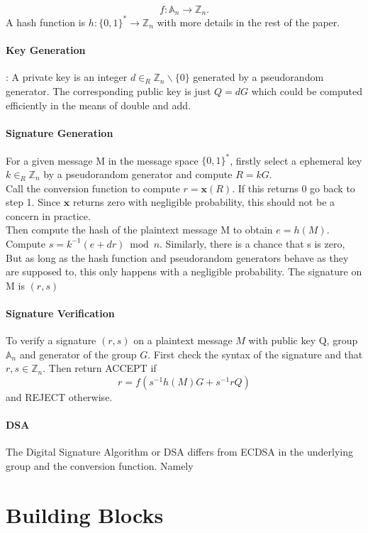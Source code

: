 \documentclass[18]{article}
\begin{document}
\begin{equation*}
f: \mathbb{A}_n \to \mathbb{Z}_n.
\end{equation*}
A hash function is $h:\{0,1\}^* \to \mathbb{Z}_n$ with more details in the rest of the paper.\\
\paragraph{Key Generation}: A private key is an integer $d\in _R \mathbb{Z}_n \backslash \{0\}$ generated by a pseudorandom generator.
The corresponding public key is just $Q=dG$ which could be computed efficiently in the means of double and add.
\paragraph{Signature Generation}
For a given message M in the message space $\{0,1\}^*$, firstly select a ephemeral key $k\in_R \mathbb{Z}_n$ by a pseudorandom generator and compute $R=kG$. \\
Call the conversion function to compute $r=\mathbf{x}(R)$. If this returns 0 go back to step 1. Since $\mathbf{x}$ returns zero with negligible probability, this should not be a concern in practice.\\
Then compute the hash of the plaintext message M to obtain $e=h(M)$. Compute $s=k^{-1}(e+dr) \bmod n$. Similarly, there is a chance that s is zero, But as long as the hash function and pseudorandom generators behave as they are supposed to,
this only happens with a negligible probability. The signature on M is $(r,s)$
\paragraph{Signature Verification}
To verify a signature $(r,s)$ on a plaintext message $M$ with public key Q, group $\mathbb{A}_n$ and generator of the group $G$. First check the syntax of the signature and that $r,s \in \mathbb{Z}_n$. Then return ACCEPT if
\begin{equation*}
r=f(s^{-1}h(M)G+s^{-1}rQ)
\end{equation*}
and REJECT otherwise.
\paragraph{DSA}
The Digital Signature Algorithm or DSA differs from ECDSA in the underlying group and the conversion function. Namely


\section{Building Blocks}
\end{document}
